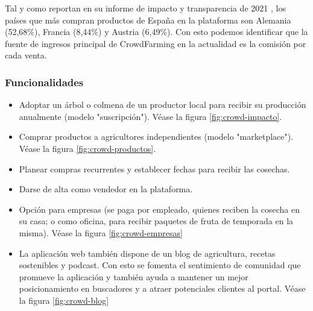 
Tal y como reportan en su informe de impacto y transparencia de 2021 \cite{informe_crowdfarming}, los países que más compran productos de España en la plataforma son Alemania (52,68\%), Francia (8,44\%) y Austria (6,49\%). Con esto podemos identificar que la fuente de ingresos principal de CrowdFarming en la actualidad es la comisión por cada venta.

\subsubsection{Funcionalidades}

\begin{itemize}

	\item Adoptar un árbol o colmena de un productor local para recibir su producción anualmente (modelo "suscripción"). Véase la figura \ref{fig:crowd-impacto}.

	\item Comprar productos a agricultores independientes (modelo "marketplace"). Véase la figura \ref{fig:crowd-productos}.

	\item Planear compras recurrentes y establecer fechas para recibir las cosechas.

	\item Darse de alta como vendedor en la plataforma.

	\item Opción para empresas (se paga por empleado, quienes reciben la cosecha en su casa; o como oficina, para recibir paquetes de fruta de temporada en la misma). Véase la figura \ref{fig:crowd-empresas}

	\item La aplicación web también dispone de un blog de agricultura, recetas sostenibles y podcast. Con esto se fomenta el sentimiento de comunidad que promueve la aplicación y también ayuda a mantener un mejor posicionamiento en buscadores y a atraer potenciales clientes al portal. Véase la figura \ref{fig:crowd-blog}

\end{itemize}


